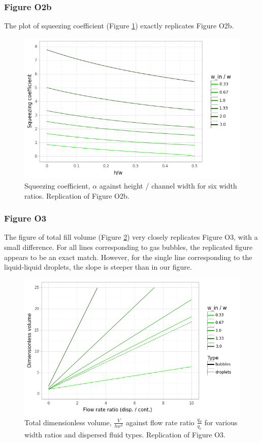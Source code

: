 \subsubsection{Figure O2b}

The plot of squeezing coefficient (Figure \ref{fig2b}) exactly replicates Figure O2b.

\begin{figure}[ht]
  \centering
  \includegraphics[width=0.8\linewidth]{../figures/fig_2b.png}
  \caption{Squeezing coefficient, $\alpha$ against height / channel width
  for six width ratios. Replication of Figure O2b.}
  \label{fig2b}
\end{figure}

\subsubsection{Figure O3}

The figure of total fill volume (Figure \ref{fig3}) very closely replicates Figure O3, with a small
difference. For all lines corresponding to gas bubbles, the replicated figure appears to be
an exact match. However, for the single line corresponding to the liquid-liquid droplets, the
slope is steeper than in our figure.

\begin{figure}[ht]
  \centering
  \includegraphics[width=0.8\linewidth]{../figures/fig_3.png}
  \caption{Total dimensionless volume, $\frac{V}{hw^2}$ against flow rate ratio $\frac{q_d}{q_c}$
  for various width ratios and dispersed fluid types. Replication of Figure O3.}
  \label{fig3}
\end{figure}


